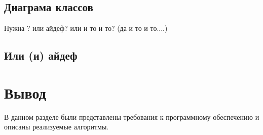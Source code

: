 \subsection{Диаграма классов}

Нужна ? или айдеф? или и то и то? (да и то и то....)

\subsection{Или (и) айдеф}

\section*{Вывод}

В данном разделе были представлены требования к программному обеспечению и описаны реализуемые алгоритмы.

